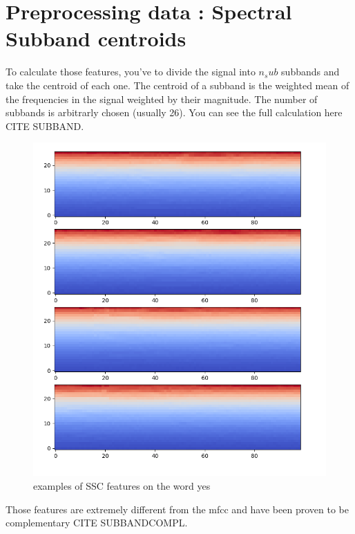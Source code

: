 \section{Preprocessing data : Spectral Subband centroids}

To calculate those features, you've to divide the signal into $n_sub$ subbands and take the centroid of each one. The centroid of a subband is the weighted mean of the frequencies in the signal weighted by their magnitude. The number of subbands is arbitrarly chosen (usually 26). You can see the full calculation here CITE SUBBAND.

\newpage

\begin{figure}[!h]
    \centering
    \includegraphics[width=1\textwidth]{chapters/pictures/ssc_yes.PNG}
    \caption{examples of SSC features on the word yes}
    \label{fig:mfcc_yes}
\end{figure}

Those features are extremely different from the mfcc and have been proven to be complementary CITE SUBBANDCOMPL. 